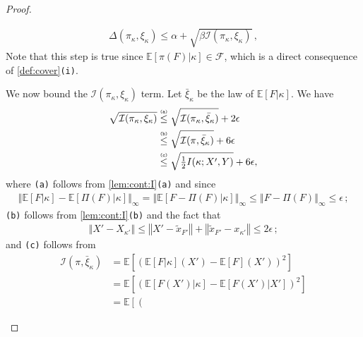 \documentclass[letter, 12pt]{report}
\newcommand{\explan}[1]{\stackrel{\text{\tiny \texttt{#1}}}}
\newcommand{\norm}[1]{\left \Vert  #1 \right \Vert}
\newcommand{\E}{\mathbb E}
\newcommand{\sF}{\mathscr F}
\newcommand{\cI}{\mathcal I}
\newcommand{\1}{\mathbf{1}}
\theoremstyle{plain}
\theoremstyle{definition}
\theoremstyle{remark}
\begin{document}
\begin{proof}
\begin{enumsteps}
        \begin{align}
            \Delta(\pi_\kappa, \xi_\kappa) \leq \alpha + \sqrt{\beta \cI(\pi_\kappa, \xi_\kappa)}\,,
            \label{eq:tsmain-2}
        \end{align}
        Note that this step is true since $\E[\pi(F)|\kappa] \in \sF$, which is a direct consequence of \cref{def:cover}\texttt{(i)}.
        \item \label{step:tsmain-3} We now bound the $\cI(\pi_\kappa, \xi_\kappa)$ term.
        Let $\bar{\xi}_\kappa$ be the law of $\E[F|\kappa]$.
        We have
        \begin{align}
            \sqrt{\cI(\pi_\kappa, \xi_\kappa)}
             & \explan{(a)}
            \leq \sqrt{\cI(\pi_\kappa, \bar{\xi}_\kappa)} + 2\epsilon \nonumber \\
             & \explan{(b)}
            \leq \sqrt{\cI(\pi, \bar{\xi}_\kappa)} + 6\epsilon \nonumber        \\
             & \explan{(c)}
            \leq \sqrt{\tfrac12 I(\kappa; X', Y)} + 6\epsilon, \label{eq:tsmain-3}
        \end{align}
        where \texttt{(a)} follows from \cref{lem:cont:I}\texttt{(a)} and since
        \begin{align*}
            \norm{\E[F|\kappa] - \E[\Pi(F)|\kappa]}_\infty
            =
            \norm{\E[F - \Pi(F)|\kappa]}_\infty
            \leq \norm{F - \Pi(F)}_\infty
            \leq \epsilon \,;
        \end{align*}
        \texttt{(b)} follows from \cref{lem:cont:I}\texttt{(b)} and the fact that
        \begin{align*}
            \norm{X' - X_{\kappa'}}
            \leq \norm{X' - \tilde{x}_{F'}}
            +
            \norm{\tilde x_{F'} - x_{\kappa'}}
            \leq 2\epsilon\,;
        \end{align*}
        and \texttt{(c)} follows from
        \begin{align*}
            \cI(\pi, \bar{\xi}_\kappa)
             & =
            \E\left[
                \left(
                \E[F|\kappa](X')
                -
                \E[F](X')
                \right)^2
            \right] \\
             & =
            \E\left[
                \left(
                \E[F(X')|\kappa]
                -
                \E[F(X')|X']
                \right)^2
            \right] \\
             & =
            \E\left[
                \left(

\end{align*}
\end{enumsteps}
\end{proof}
\end{document}
